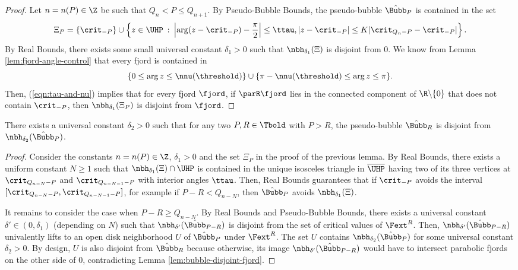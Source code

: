 \documentclass{amsart}
\begin{document}
\begin{proof}
    Let $n = n(P) \in \Z$ be such that $Q_n < P \leq Q_{n+1}$.
    By Pseudo-Bubble Bounds, the pseudo-bubble $\hat{\Bubb}_P$ is contained in the set
    \[
        \Xi_P = \{ \crit_{-P}\} \cup \left\{ z \in \UHP \: : \: \left| \arg(z-\crit_{-P}) - \frac{\pi}{2} \right| \leq \ttau, |z-\crit_{-P}| \leq K |\crit_{Q_n-P}-\crit_{-P} | \right\}.
    \]
    By Real Bounds, there exists some small universal constant $\delta_1>0$ such that $\nbh_{\delta_1}(\Xi)$ is disjoint from $0$.
    We know from Lemma \ref{lem:fjord-angle-control} that every fjord is contained in
    \[
        \{ 0 \leq \arg z \leq \nnu(\threshold)\} \cup \{\pi - \nnu(\threshold) \leq \arg z \leq \pi \}.
    \]
    Then, (\ref{eqn:tau-and-nu}) implies that for every fjord $\fjord$, if $\parR \fjord$ lies in the connected component of $\R \backslash \{ 0 \}$ that does not contain $\crit_{-P}$, then $\nbh_{\delta_1}(\Xi_P)$ is disjoint from $\fjord$.
\end{proof}

\begin{lemma}
\label{lem:primary-bubble-disjoint}
    There exists a universal constant $\delta_2>0$ such that for any two $P, R \in \Tbold$ with $P>R$, the pseudo-bubble $\hat{\Bubb}_R$ is disjoint from $\nbh_{\delta_2}(\hat{\Bubb}_P)$.
\end{lemma}

\begin{proof}
    Consider the constants $n = n(P) \in \Z$, $\delta_1>0$ and the set $\Xi_P$ in the proof of the previous lemma.
    By Real Bounds, there exists a uniform constant $N \geq 1$ such that
    $\nbh_{\delta_1}(\Xi) \cap \UHP$ is contained in the unique isosceles triangle in $\overline{\UHP}$ having two of its three vertices at $\crit_{Q_{n-N}-P}$ and $\crit_{Q_{n-N-1}-P}$ with interior angles $\ttau$.
    Then, Real Bounds guarantees that if $\crit_{-P}$ avoids the interval $[\crit_{Q_{n-N}-P}, \crit_{Q_{n-N-1}-P}]$, for example if $P-R < Q_{n-N}$, then $\hat{\Bubb}_P$ avoids $\nbh_{\delta_1}(\Xi)$.

    It remains to consider the case when $P-R \geq Q_{n-N}$.
    By Real Bounds and Pseudo-Bubble Bounds, there exists a universal constant $\delta' \in (0,\delta_1)$ (depending on $N$) such that $\nbh_{\delta'}(\hat{\Bubb}_{P-R})$ is disjoint from the set of critical values of $\Fext^R$.
    Then, $\nbh_{\delta'}(\hat{\Bubb}_{P-R})$ univalently lifts to an open disk neighborhood $U$ of $\hat{\Bubb}_P$ under $\Fext^R$.
    The set $U$ contains $\nbh_{\delta_2}(\hat{\Bubb}_{P})$ for some universal constant $\delta_2>0$. 
    By design, $U$ is also disjoint from $\hat{\Bubb}_R$ because otherwise, its image $\nbh_{\delta'}(\hat{\Bubb}_{P-R})$ would have to intersect parabolic fjords on the other side of $0$, contradicting Lemma \ref{lem:bubble-disjoint-fjord}.
\end{proof}
\end{document}
